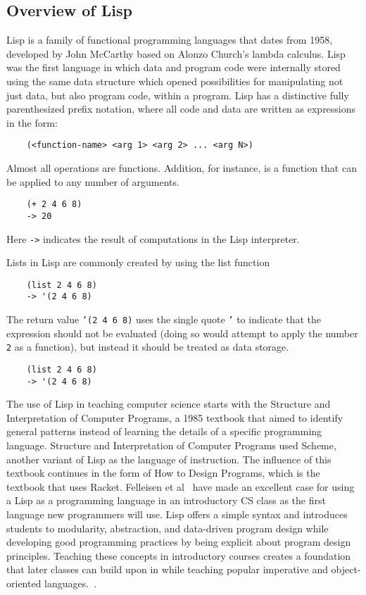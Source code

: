 \documentclass[12pt]{article}
\newcommand{\comment}[1]{{\bf \tt  {#1}}}
\newcommand{\emcomment}[1]{\textcolor{ForestGreen}{\comment{Elena: {#1}}}}
\newcommand{\hfcomment}[1]{\textcolor{Teal}{\comment{Henry: {#1}}}}
\begin{document}
	\subsection{Overview of Lisp}\label{sec:lisp}

	Lisp is a family of functional programming languages that dates from 1958, developed by John McCarthy based on Alonzo Church's lambda calculus.
	Lisp was the first language in which data and program code were internally stored using the same data structure which opened possibilities for manipulating not just data, but also program code, within a program.
	Lisp has a distinctive fully parenthesized prefix notation, where all code and data are written as expressions in the form:
	\begin{verbatim}
	(<function-name> <arg 1> <arg 2> ... <arg N>)
	\end{verbatim}
Almost all operations are functions. Addition, for instance, is a function that can be applied to any number of arguments.
	\begin{verbatim}
	(+ 2 4 6 8)
	-> 20
	\end{verbatim}
Here \texttt{->} indicates the result of computations in the Lisp interpreter. 

Lists in Lisp are commonly created by using the list function
 	\begin{verbatim}
	(list 2 4 6 8)
	-> '(2 4 6 8)
	\end{verbatim}
The return value \texttt{'(2 4 6 8)} uses the single quote \texttt{'} to indicate that the expression should not be evaluated (doing so would attempt to apply the number \texttt{2} as a function), but instead it should be treated as data storage. 
	\begin{verbatim}
	(list 2 4 6 8)
	-> '(2 4 6 8)
	\end{verbatim}
	
	The use of Lisp in teaching computer science starts with the Structure and Interpretation of Computer Programs, a 1985 textbook that aimed to identify general patterns instead of learning the details of a specific programming language. 
	Structure and Interpretation of Computer Programs used Scheme, another variant of Lisp as the language of instruction. The influence of this textbook continues in the form of How to Design Programs, which is the textbook that uses Racket. 
	Felleisen et al~\cite{Felleisen:2004} have made an excellent case for using a Lisp as a programming language in an introductory CS class as the first language new programmers will use.
	 Lisp offers a simple syntax and introduces students to modularity, abstraction, and data-driven program design while developing good programming practices by being explicit about program design principles.
	 Teaching these concepts in introductory courses creates a foundation that later classes can build upon in  while teaching popular imperative and object-oriented languages.~\cite{Bieniusa:2008}.
	 
\end{document}
